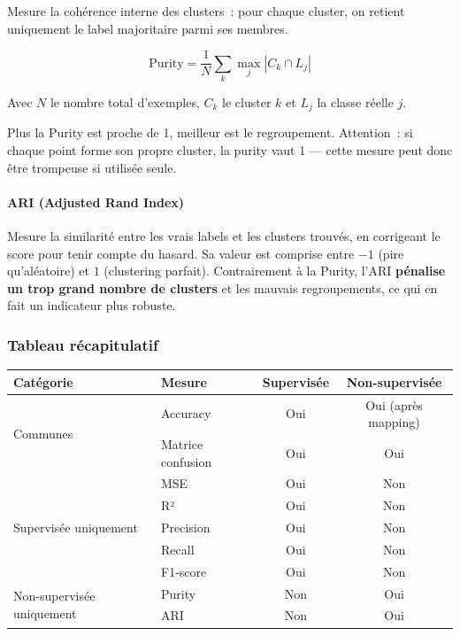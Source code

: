 \documentclass[12pt,a4paper]{article}
\begin{document}
Mesure la cohérence interne des clusters~: pour chaque cluster, on retient uniquement le label majoritaire parmi ses membres.

\[
  \text{Purity} = \frac{1}{N}\sum_k \max_j |C_k \cap L_j|
\]

Avec $N$ le nombre total d'exemples, $C_k$ le cluster $k$ et $L_j$ la classe réelle $j$.

\begin{remarque}
Plus la Purity est proche de 1, meilleur est le regroupement. Attention~: si chaque point forme son propre cluster, la purity vaut 1 --- cette mesure peut donc être trompeuse si utilisée seule.
\end{remarque}

\paragraph{ARI (Adjusted Rand Index)}

Mesure la similarité entre les vrais labels et les clusters trouvés, en corrigeant le score pour tenir compte du hasard. Sa valeur est comprise entre $-1$ (pire qu'aléatoire) et $1$ (clustering parfait). Contrairement à la Purity, l'ARI \textbf{pénalise un trop grand nombre de clusters} et les mauvais regroupements, ce qui en fait un indicateur plus robuste.

\subsubsection{Tableau récapitulatif}

\begin{center}
\renewcommand{\arraystretch}{1.2}
\begin{tabular}{llcc}
\toprule
\textbf{Catégorie} & \textbf{Mesure} & \textbf{Supervisée} & \textbf{Non-supervisée} \\
\midrule
\multirow{2}{*}{Communes}
  & Accuracy          & Oui & Oui (après mapping) \\
  & Matrice confusion & Oui & Oui \\
\midrule
\multirow{5}{*}{Supervisée uniquement}
  & MSE               & Oui & Non \\
  & R²                & Oui & Non \\
  & Precision         & Oui & Non \\
  & Recall            & Oui & Non \\
  & F1-score          & Oui & Non \\
\midrule
\multirow{2}{*}{Non-supervisée uniquement}
  & Purity            & Non & Oui \\
  & ARI               & Non & Oui \\
\bottomrule
\end{tabular}
\end{center}
\end{document}
